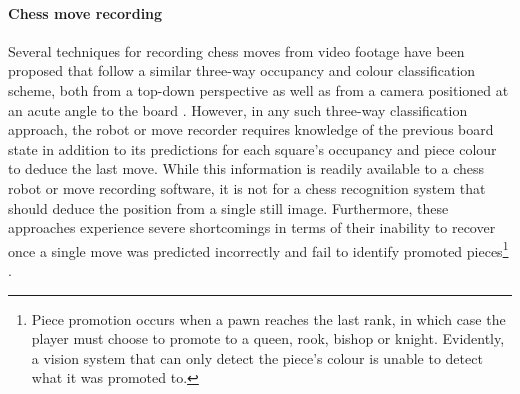 \paragraph{Chess move recording}
Several techniques for recording chess moves from video footage have been proposed that follow a similar three-way occupancy and colour classification scheme, both from a top-down perspective \cite{sokic2008,wang2013} as well as from a camera positioned at an acute angle to the board \cite{hack2014}.
However, in any such three-way classification approach, the robot or move recorder requires knowledge of the previous board state in addition to its predictions for each square's occupancy and piece colour to deduce the last move. 
While this information is readily available to a chess robot or move recording software, it is not for a chess recognition system that should deduce the position from a single still image.
Furthermore, these approaches experience severe shortcomings in terms of their inability to recover once a single move was predicted incorrectly and fail to identify promoted pieces\footnote{Piece promotion occurs when a pawn reaches the last rank, in which case the player must choose to promote to a queen, rook, bishop or knight. Evidently, a vision system that can only detect the piece's colour is unable to detect what it was promoted to.} \cite{cour2002}.

